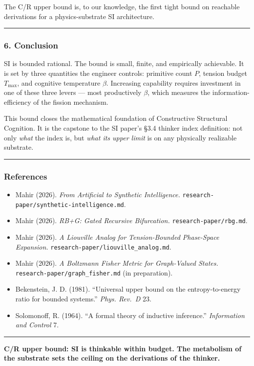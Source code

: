 \documentclass[
  11pt,
  a4paper,
]{article}
\providecommand{\tightlist}{%
  \setlength{\itemsep}{0pt}\setlength{\parskip}{0pt}}
\begin{document}
The C/R upper bound is, to our knowledge, the first tight bound on
reachable derivations for a physics-substrate SI architecture.

\begin{center}\rule{0.5\linewidth}{0.5pt}\end{center}

\subsubsection{6. Conclusion}\label{conclusion-4}

SI is bounded rational. The bound is small, finite, and empirically
achievable. It is set by three quantities the engineer controls:
primitive count \(P\), tension budget \(T_\text{max}\), and cognitive
temperature \(\beta\). Increasing capability requires investment in one
of these three levers --- most productively \(\beta\), which measures
the information-efficiency of the fission mechanism.

This bound closes the mathematical foundation of Constructive Structural
Cognition. It is the capstone to the SI paper's §3.4 thinker index
definition: not only \emph{what} the index is, but \emph{what its upper
limit} is on any physically realizable substrate.

\begin{center}\rule{0.5\linewidth}{0.5pt}\end{center}

\subsubsection{References}\label{references-5}

\begin{itemize}
\tightlist
\item
  Mahir (2026). \emph{From Artificial to Synthetic Intelligence.}
  \texttt{research-paper/synthetic-intelligence.md}.
\item
  Mahir (2026). \emph{RB+G: Gated Recursive Bifurcation.}
  \texttt{research-paper/rbg.md}.
\item
  Mahir (2026). \emph{A Liouville Analog for Tension-Bounded Phase-Space
  Expansion.} \texttt{research-paper/liouville\_analog.md}.
\item
  Mahir (2026). \emph{A Boltzmann Fisher Metric for Graph-Valued
  States.} \texttt{research-paper/graph\_fisher.md} (in preparation).
\item
  Bekenstein, J. D. (1981). ``Universal upper bound on the
  entropy-to-energy ratio for bounded systems.'' \emph{Phys. Rev.~D} 23.
\item
  Solomonoff, R. (1964). ``A formal theory of inductive inference.''
  \emph{Information and Control} 7.
\end{itemize}

\begin{center}\rule{0.5\linewidth}{0.5pt}\end{center}

\textbf{C/R upper bound: SI is thinkable within budget. The metabolism
of the substrate sets the ceiling on the derivations of the thinker.}
\end{document}
